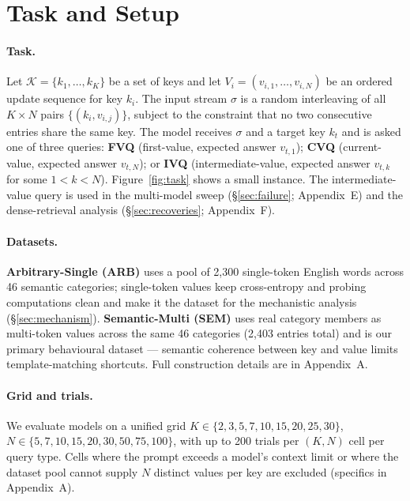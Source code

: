 \documentclass[letterpaper]{article} %
\begin{document}
\section{Task and Setup}
\label{sec:setup}

\paragraph{Task.}
Let $\mathcal{K} = \{k_1, \ldots, k_K\}$ be a set of keys and let
$V_i = (v_{i,1}, \ldots, v_{i,N})$ be an ordered update sequence for
key $k_i$.
The input stream $\sigma$ is a random interleaving of all
$K \times N$ pairs $\{(k_i, v_{i,j})\}$, subject to the constraint
that no two consecutive entries share the same key.
The model receives $\sigma$ and a target key $k_t$ and is asked one
of three queries: \textbf{FVQ} (first-value, expected answer
$v_{t,1}$); \textbf{CVQ} (current-value, expected answer $v_{t,N}$);
or \textbf{IVQ} (intermediate-value, expected answer $v_{t,k}$ for
some $1 < k < N$).
Figure~\ref{fig:task} shows a small instance. The intermediate-value
query is used in the multi-model sweep (\S\ref{sec:failure};
Appendix~E) and the dense-retrieval analysis
(\S\ref{sec:recoveries}; Appendix~F).

\paragraph{Datasets.}
\textbf{Arbitrary-Single (ARB)} uses a pool of 2{,}300 single-token
English words across 46 semantic categories;
single-token values keep cross-entropy and probing computations
clean and make it the dataset for the mechanistic analysis
(\S\ref{sec:mechanism}).
\textbf{Semantic-Multi (SEM)} uses real category members as
multi-token values across the same 46 categories (2{,}403 entries
total) and is our primary behavioural dataset --- semantic coherence
between key and value limits template-matching shortcuts.
Full construction details are in Appendix~A.

\paragraph{Grid and trials.}
We evaluate models on a unified grid
$K \in \{2, 3, 5, 7, 10, 15, 20, 25, 30\}$,
$N \in \{5, 7, 10, 15, 20, 30, 50, 75, 100\}$, with up to 200 trials
per $(K, N)$ cell per query type.
Cells where the prompt exceeds a model's context limit or where the
dataset pool cannot supply $N$ distinct values per key are excluded
(specifics in Appendix~A).
\end{document}
